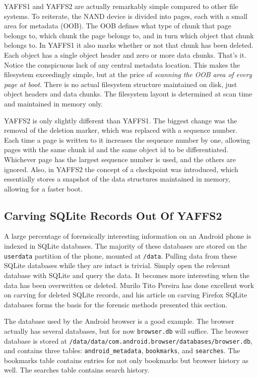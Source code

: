 YAFFS1 and YAFFS2 are actually remarkably simple compared to other file systems. To reiterate, the NAND device is divided into
pages, each with a small area for metadata (OOB).  The OOB defines what type of chunk that page belongs to, which chunk the page
belongs to, and in turn which object that chunk belongs to.  In YAFFS1 it also marks whether or not that chunk has been deleted.
Each object has a single object header and zero or more data chunks.  That's it.  Notice the conspicuous lack of any central
metadata location.  This makes the filesystem exceedingly simple, but at the price of \emph{scanning the OOB area of every page at
boot}.  There is no actual filesystem structure maintained on disk, just object headers and data chunks.  The filesystem layout is
determined at scan time and maintained in memory only. 

YAFFS2 is only slightly different than YAFFS1. The biggest change was the removal of the deletion marker, which was replaced with a
sequence number. Each time a page is written to it increases the sequence number by one, allowing pages with the same chunk id and
the same object id to be differentiated.  Whichever page has the largest sequence number is used, and the others are ignored.  Also,
in YAFFS2 the concept of a checkpoint was introduced, which essentially stores a snapshot of the data structures maintained in
memory, allowing for a faster boot.

\subsection{Carving SQLite Records Out Of YAFFS2}
A large percentage of forensically interesting information on an Android phone is indexed in SQLite databases.  The majority of
these databases are stored on the \texttt{userdata} partition of the phone, mounted at \texttt{/data}.  Pulling data from these
SQLite databases while they are intact is trivial.  Simply open the relevant database with SQLite and query the data.  It becomes
more interesting when the data has been overwritten or deleted.  Murilo Tito Pereira has done excellent work on carving for deleted
SQLite records, and his article on carving Firefox SQLite databases forms the basis for the forensic methods presented this section.
\cite{carvefirefox}

The database used by the Android browser is a good example. The browser actually has several databases, but for now
\texttt{browser.db} will suffice. The browser database is stored at \texttt{/data/data/com.android.browser/databases/browser.db},
and contains three tables: \texttt{android\_metadata}, \texttt{bookmarks}, and \texttt{searches}.  The bookmarks table contains
entries for not only bookmarks but browser history as well.  The searches table contains search history. 

